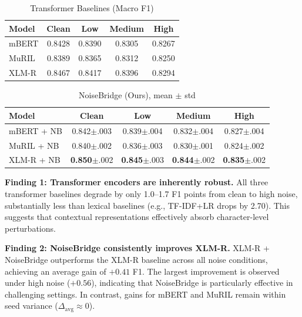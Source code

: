 \documentclass[conference]{IEEEtran}
\begin{document}
\vspace{-0.8em}

\begin{table}[H]
\caption{Transformer Baselines (Macro F1)}
\label{tab:transformer}
\centering
\small
\setlength{\tabcolsep}{3pt}
\begin{tabular}{lcccc}
\toprule
Model & Clean & Low & Medium & High \\
\midrule
mBERT & 0.8428 & 0.8390 & 0.8305 & 0.8267 \\
MuRIL & 0.8389 & 0.8365 & 0.8312 & 0.8250 \\
XLM-R & 0.8467 & 0.8417 & 0.8396 & 0.8294 \\
\bottomrule
\end{tabular}
\end{table}

\vspace{-0.8em}

\begin{table}[H]
\caption{NoiseBridge (Ours), mean $\pm$ std}
\label{tab:noisebridge}
\centering
\small
\setlength{\tabcolsep}{3pt}
\renewcommand{\arraystretch}{1.15}
\begin{tabular}{lcccc}
\toprule
Model & Clean & Low & Medium & High \\
\midrule
mBERT + NB & 0.842$\pm$.003 & 0.839$\pm$.004 & 0.832$\pm$.004 & 0.827$\pm$.004 \\
MuRIL + NB & 0.840$\pm$.002 & 0.836$\pm$.003 & 0.830$\pm$.001 & 0.824$\pm$.002 \\
XLM-R + NB & \textbf{0.850}$\pm$.002 & \textbf{0.845}$\pm$.003 & \textbf{0.844}$\pm$.002 & \textbf{0.835}$\pm$.002 \\
\bottomrule
\end{tabular}
\end{table}

\vspace{-0.3em}

\textbf{Finding 1: Transformer encoders are inherently robust.}
All three transformer baselines degrade by only 1.0--1.7 F1 points from clean to high noise, substantially less than lexical baselines (e.g., TF-IDF+LR drops by 2.70). This suggests that contextual representations effectively absorb character-level perturbations.

\textbf{Finding 2: NoiseBridge consistently improves XLM-R.}
XLM-R + NoiseBridge outperforms the XLM-R baseline across all noise conditions, achieving an average gain of $+0.41$ F1. The largest improvement is observed under high noise ($+0.56$), indicating that NoiseBridge is particularly effective in challenging settings. In contrast, gains for mBERT and MuRIL remain within seed variance ($\Delta_{\text{avg}} \approx 0$).
\end{document}
